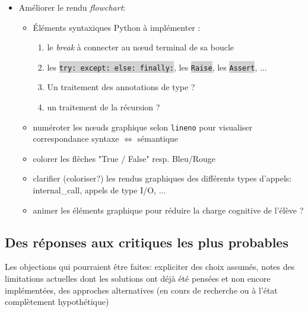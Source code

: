 \documentclass[11pt,a4paper]{article}
\newcommand{\code}[1]{\colorbox{lightgray}{\texttt{\small #1}}}
\begin{document}
\begin{itemize}
    \item Améliorer le rendu \textit{flowchart}:
    \begin{itemize}
    
    \item Éléments syntaxiques Python à implémenter : 
    \begin{enumerate}
        \item le \textit{break} à connecter au nœud terminal de sa boucle
        \item les \code{try: except: else: finally:}, les \code{Raise}, les \code{Assert}, ...
        \item Un traitement des annotations de type ?
        \item un traitement de la récursion ?
    \end{enumerate}
    
    \item numéroter les nœuds graphique selon \texttt{lineno} pour visualiser correspondance syntaxe $\Leftrightarrow$ sémantique
    
    \item colorer les flèches "True / False" resp. Bleu/Rouge
    
    \item clarifier (coloriser?) les rendus graphiques des différents types d'appels: internal\_call, appels de type I/O, ...

    \item animer les éléments graphique pour réduire la charge cognitive de l'élève ?
    \end{itemize}
    
\end{itemize}

\subsection{ Des réponses aux critiques les plus probables}
Les objections qui pourraient être faites: expliciter des choix assumés, notes des limitations actuelles dont les solutions ont déjà été pensées et non encore implémentées, des approches alternatives (en cours de recherche ou à l'état complètement hypothétique)
\end{document}
